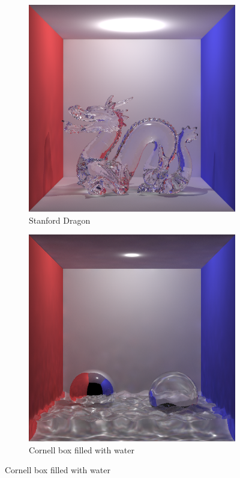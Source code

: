 \begin{figure}
\centering
	\begin{subfigure}[b]{0.6\textwidth}
	\includegraphics[width=\textwidth]{./images/renders/dragon.png}
	\caption{Stanford Dragon}
	\end{subfigure}

	\begin{subfigure}[b]{0.6\textwidth}
	\includegraphics[width=\textwidth]{./images/renders/water.png}
	\caption{Cornell box filled with water}
	\end{subfigure}
\end{figure}

